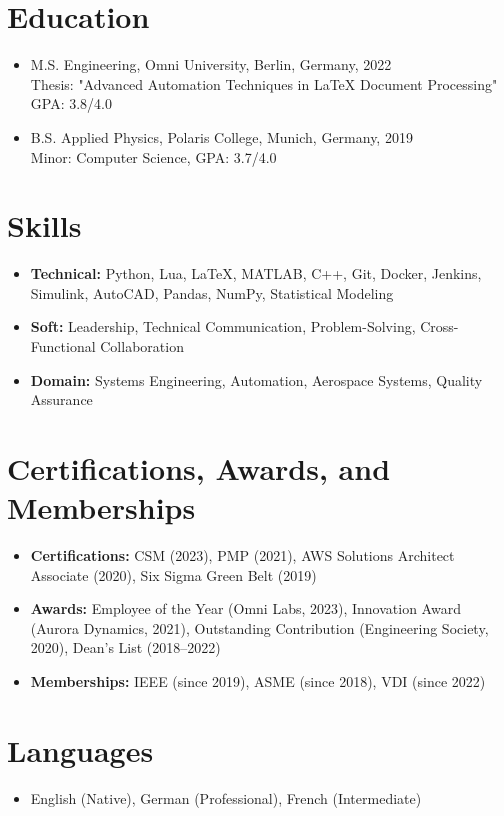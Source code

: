 \documentclass[
    language=english,
    doctype=cv,
    institution=none,
    titlestyle=cv
]{../../omnilatex}
\begin{document}
\begin{multicols}{2}
    \section{Education}
    \begin{itemize}
        \item M.S. Engineering, Omni University, Berlin, Germany, 2022 \\
              Thesis: "Advanced Automation Techniques in LaTeX Document Processing" \\
              GPA: 3.8/4.0
        \item B.S. Applied Physics, Polaris College, Munich, Germany, 2019 \\
              Minor: Computer Science, GPA: 3.7/4.0
    \end{itemize}

    \section{Skills}
    \begin{itemize}
        \item \textbf{Technical:} Python, Lua, LaTeX, MATLAB, C++, Git, Docker, Jenkins, Simulink, AutoCAD, Pandas, NumPy, Statistical Modeling
        \item \textbf{Soft:} Leadership, Technical Communication, Problem-Solving, Cross-Functional Collaboration
        \item \textbf{Domain:} Systems Engineering, Automation, Aerospace Systems, Quality Assurance
    \end{itemize}

    \section{Certifications, Awards, and Memberships}
    \begin{itemize}
        \item \textbf{Certifications:} CSM (2023), PMP (2021), AWS Solutions Architect Associate (2020), Six Sigma Green Belt (2019)
        \item \textbf{Awards:} Employee of the Year (Omni Labs, 2023), Innovation Award (Aurora Dynamics, 2021), Outstanding Contribution (Engineering Society, 2020), Dean's List (2018--2022)
        \item \textbf{Memberships:} IEEE (since 2019), ASME (since 2018), VDI (since 2022)
    \end{itemize}

    \section{Languages}
    \begin{itemize}
        \item English (Native), German (Professional), French (Intermediate)
    \end{itemize}


\end{multicols}
\end{document}

